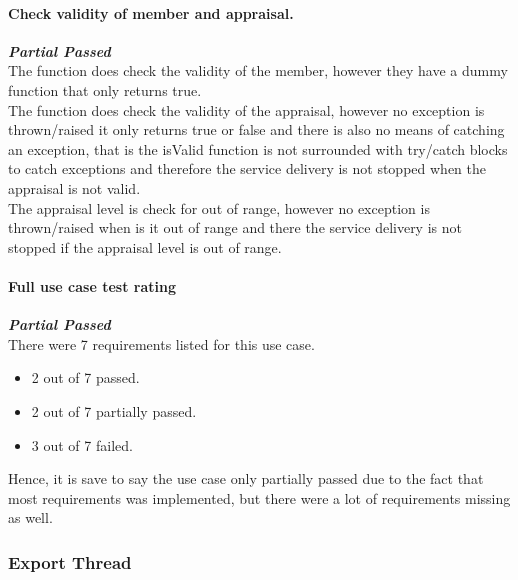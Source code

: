 \paragraph{\color{black}Check validity of member and appraisal.\\}
\color{myOrange}
\textbf{\small \emph{Partial Passed}} \\
\color{black}The function does check the validity of the member, however they have a dummy function that only returns true.\\
The function does check the validity of the appraisal, however no exception is thrown/raised it only returns true or false and there is also no means of catching an exception, that is the isValid function is not surrounded with try/catch blocks to catch exceptions and therefore the service delivery is not stopped when the appraisal is not valid.\\
The appraisal level is check for out of range, however no exception is thrown/raised when is it out of range and there the service delivery is not stopped if the appraisal level is out of range.
\par

\paragraph{\color{black} Full use case test rating\\}
\color{myOrange}
\textbf{\small \emph{Partial Passed}} \\
\color{black}
There were 7 requirements listed for this use case. 
\begin{itemize}
	\item{2 out of 7 passed.} 
	\item{2 out of 7 partially passed.}
	\item{3 out of 7 failed.}
\end{itemize}
Hence, it is save to say the use case only partially passed due to the fact that most requirements was implemented, but there were a lot of requirements missing as well.
\par

\subsubsection{Export Thread }
